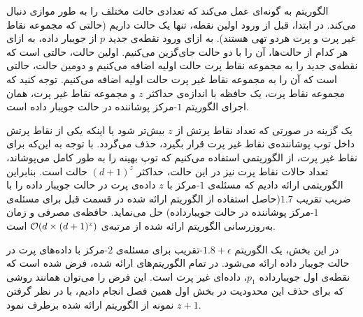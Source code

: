 


الگوریتم به گونه‌ای عمل می‌کند که تعدادی حالت مختلف را به طور موازی دنبال می‌کند. در ابتدا، قبل از ورود اولین نقطه، تنها یک حالت داریم (حالتی که مجموعه نقاط غیر پرت و پرت هردو تهی هستند). به ازای ورود نقطه‌ی جدید $p$ از جویبار داده، به ازای هر کدام از حالت‌ها، آن را با دو حالت جای‌گزین می‌کنیم. اولین حالت، حالتی است که نقطه‌ی جدید را به مجموعه‌ نقاط پرت حالت اولیه اضافه می‌کنیم و دومین حالت، حالتی است که آن را به مجموعه نقاط غیر پرت حالت اولیه اضافه ‌می‌کنیم. توجه کنید که مجموعه نقاط پرت، یک حافظه‌ با اندازه‌ی حداکثر $z$ و مجموعه نقاط غیر پرت، همان اجرای الگوریتم $1$-مرکز پوشاننده در حالت جویبار داده است. 

یک گزینه در صورتی که تعداد نقاط‌ پرتش از $z$ بیش‌تر شود یا اینکه یکی از نقاط پرتش داخل توپ پوشاننده‌ی نقاط غیر پرت قرار بگیرد، حذف می‌گردد. با توجه به این‌که برای نقاط غیر پرت، از‌ الگوریتمی استفاده می‌کنیم که توپ بهینه را به طور کامل می‌پوشاند، تعداد حالات نقاط پرت نیز در این حالت، حداکثر $(d+1)^z$ حالت است. بنابراین الگوریتمی ارائه دادیم که مسئله‌ی $1$-مرکز با $z$ داده‌ی پرت در حالت جویبار داده را با ضریب تقریب $1.7$(حاصل استفاده از الگوریتم ارائه شده در قسمت قبل برای مسئله‌ی $1$-مرکز پوشاننده در حالت جویبارداده) حل می‌نماید. حافظه‌ی مصرفی و زمان به‌روزرسانی الگوریتم ارائه شده از مرتبه‌ی $\mathcal{O}(d \times (d+1)^z)$ است.


در این بخش، یک الگوریتم $1.8 + \epsilon$-تقریب برای مسئله‌ی $2$-مرکز با داده‌های پرت در حالت جویبار داده ارائه می‌شود. در تمام الگوریتم‌های ارائه شده، فرض شده است که نقطه‌ی اول جویبارداده $p_1$، داده‌ای غیر پرت است. این فرض را می‌توان همانند روشی که برای حذف این محدودیت در بخش اول همین فصل انجام دادیم، با در نظر گرفتن $z+1$ نمونه از الگوریتم ارائه شده برطرف نمود.









